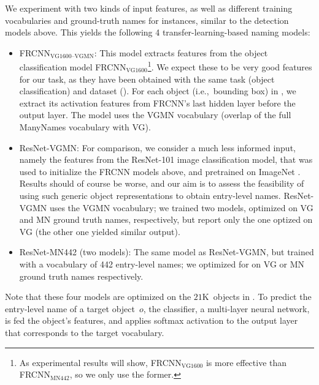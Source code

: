 We experiment with two kinds of input features, as well as different training vocabularies and ground-truth names for instances, similar to the detection models above.
This yields the following 4 transfer-learning-based naming models:
\begin{itemize}
\item FRCNN$_{\text{VG1600--VGMN}}$:
	This model extracts features from the object classification model FRCNN$_{\text{VG1600}}$\footnote{
	As experimental results will show, FRCNN$_{\text{VG1600}}$ is more effective than FRCNN$_{\text{MN442}}$, so we only use the former.
}. We expect these to be very good features for our task, as they have been obtained with the same task (object classification) and dataset (\vg).  For each object (i.e.,~bounding box) in \mn, we extract its activation features from FRCNN's last hidden layer before the output layer. The model uses the VGMN vocabulary (overlap of the full ManyNames vocabulary with VG).
  \item ResNet-VGMN: 
For comparison, we consider a much less informed input, namely the features from the ResNet-101 image classification model, that was used to initialize the FRCNN models above, and pretrained on ImageNet \cite{imagenet_cvpr09}. 
Results should of course be worse, and our aim is to assess the feasibility of using such generic object representations to obtain entry-level names. ResNet-VGMN uses the VGMN vocabulary; we trained two models, optimized on VG and MN ground truth names, respectively, but report only the one optized on VG (the other one yielded similar output).
 \item  ResNet-MN442 (two models):
 The same model as ResNet-VGMN, but trained with a vocabulary of 442 entry-level names; we optimized for on VG or MN ground truth names respectively.
\end{itemize}
Note that these four models are optimized on the $21$K~objects in \mn. 
To predict the entry-level name of a target object~$o$, the classifier, a multi-layer neural network, is fed the object's features, and applies softmax activation to the output layer that corresponds to the target vocabulary. 


